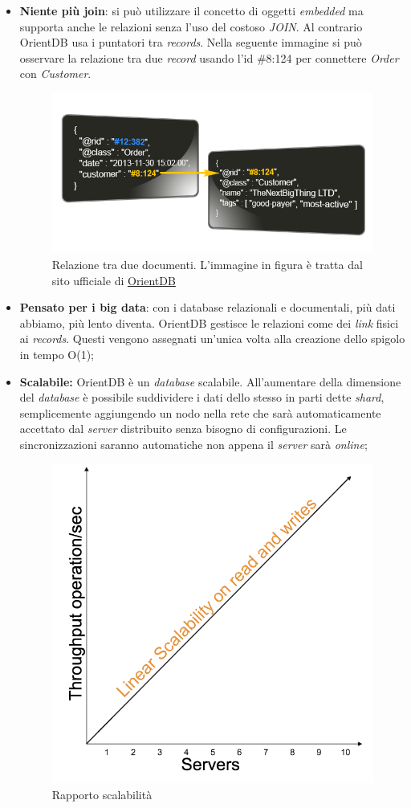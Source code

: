 \begin{itemize}
	\item \textbf{Niente più join}: si può utilizzare il concetto di oggetti \textit{embedded} ma supporta anche le relazioni senza l'uso del costoso \textit{JOIN}. Al contrario OrientDB usa i puntatori tra \textit{records}. Nella seguente immagine si può osservare la relazione tra due \textit{record} usando l'id \#8:124 per connettere \textit{Order} con \textit{Customer}.
	\begin{figure}[h]
	\centering
	\includegraphics[width=0.8\linewidth]{immagini/json_linked3}
	\caption[Relazione tra due documenti]{Relazione tra due documenti. L'immagine in figura è tratta dal sito ufficiale di \href{http://orientdb.com/orientdb-vs-mongodb/}{OrientDB}}
	\label{fig:json_linked3}
	\end{figure}
	
\newpage
\item \textbf{Pensato per i big data}: con i database relazionali e documentali, più dati abbiamo, più lento diventa. OrientDB gestisce le relazioni come dei \textit{link} fisici ai \textit{records}. Questi vengono assegnati un'unica volta alla creazione dello spigolo in tempo O(1);
\item \textbf{Scalabile:} OrientDB è un \textit{database} scalabile. All'aumentare della dimensione del \textit{database} è possibile suddividere i dati dello stesso in parti dette \textit{shard}, semplicemente aggiungendo un nodo nella rete che sarà automaticamente accettato dal \textit{server} distribuito senza bisogno di configurazioni. Le sincronizzazioni saranno automatiche non appena il \textit{server} sarà \textit{online};
\begin{figure}[h]
\centering
\includegraphics[width=0.65\linewidth]{immagini/rapporto-scalabilita}
\caption[Rapporto scalabilità]{Rapporto scalabilità}
\label{fig:rapporto-scalabilità}
\end{figure}


\end{itemize}
